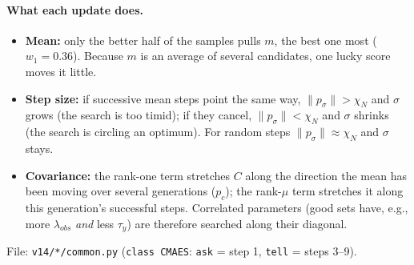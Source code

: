 \documentclass[11pt,a4paper]{article}
\begin{document}
\paragraph{What each update does.}
\begin{itemize}
  \item \textbf{Mean:} only the better half of the samples pulls $m$, the best one most ($w_1 = 0.36$). Because $m$
        is an average of several candidates, one lucky score moves it little.
  \item \textbf{Step size:} if successive mean steps point the same way, $\|p_\sigma\| > \chi_N$ and $\sigma$
        grows (the search is too timid); if they cancel, $\|p_\sigma\| < \chi_N$ and $\sigma$ shrinks (the search is
        circling an optimum). For random steps $\|p_\sigma\| \approx \chi_N$ and $\sigma$ stays.
  \item \textbf{Covariance:} the rank-one term stretches $C$ along the direction the mean has been moving over
        several generations ($p_c$); the rank-$\mu$ term stretches it along this generation's successful steps.
        Correlated parameters (good sets have, e.g., more $\lambda_{obs}$ \emph{and} less $\tau_y$) are therefore
        searched along their diagonal.
\end{itemize}

File: \texttt{v14/*/common.py} (\texttt{class CMAES}: \texttt{ask} = step 1, \texttt{tell} = steps 3--9).

\end{document}
